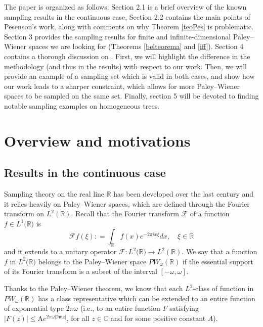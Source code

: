\documentclass[12pt]{amsart}
\theoremstyle{definition}
\numberwithin{equation}{section}
\theoremstyle{definition}
\theoremstyle{remark}
\numberwithin{equation}{section}
\begin{document}
The paper is organized as follows: Section 2.1 is a brief overview of the known sampling results in the continuous case, Section 2.2 contains the main points of Pesenson's work, along with comments on why Theorem \ref{teoPes} is problematic. Section 3 provides the sampling results for finite and infinite-dimensional Paley--Wiener spaces we are looking for (Theorems \ref{belteorema} and \ref{iff}). Section 4 contains a thorough discussion on \cite{FP}. First, we will highlight the difference in the methodology (and thus in the results) with respect to our work. Then, we will provide an example of a sampling set which is valid in both cases, and show how our work leads to a sharper constraint, which allows for more Paley--Wiener spaces to be sampled on the same set. Finally, section 5 will be devoted to finding notable sampling examples on homogeneous trees.

\section{Overview and motivations}
\subsection{Results in the continuous case}
Sampling theory on the real line $\mathbb{R}$ has been developed over the last century and it relies heavily on Paley--Wiener spaces, which are defined through the Fourier transform on $L^2(\mathbb{R})$. Recall that the Fourier transform $\mathcal{F}$ of a function $f \in L^1(\mathbb{R)}$ is
$$
\mathcal{F}f(\xi) : = \int_{\mathbb{R}}f(x)e^{-2\pi ix\xi}dx, \quad \xi \in \mathbb{R}
$$
and it extends to a unitary operator $\mathcal{F}: L^2(\mathbb{R)} \longrightarrow L^2(\mathbb{R})$. We say that a function $f$ in $L^2(\mathbb{R)}$ belongs to the Paley--Wiener space $PW_\omega(\mathbb{R})$ if the essential support of its Fourier transform is a subset of the interval $[-\omega,\omega]$.

Thanks to the Paley--Wiener theorem, we know that each $L^2$-class of function in $PW_\omega(\mathbb{R})$ has a class representative which can be extended to an entire function of exponential type $2\pi\omega$ (i.e., to an entire function $F$ satisfying $|F(z)| \leq \mathrm{A}e^{2\pi\omega|\mathfrak{Im}z|} $, for all $z \in \mathbb{C}$ and for some positive constant $A$).
\end{document}
